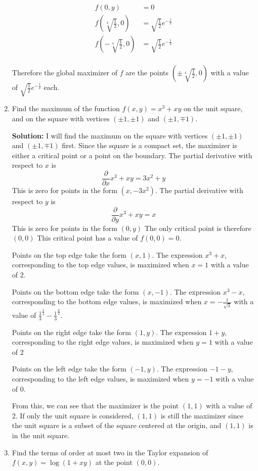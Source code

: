 \documentclass{report}
\newcommand{\solution}{\textbf{Solution: }}
\newcommand{\pdiv}[1]{\frac{\partial}{\partial #1}}
\begin{document}
\begin{enumerate}
	\begin{align*}
		f(0, y) &= 0 \\
		f(\sqrt[4]{\frac{1}{2}}, 0) &= \sqrt{\frac{1}{2}}e^{-\frac{1}{2}} \\
		f(-\sqrt[4]{\frac{1}{2}}, 0) &= \sqrt{\frac{1}{2}}e^{-\frac{1}{2}} \\
	\end{align*}

	Therefore the global maximizer of $f$ 
	are the points $(\pm \sqrt[4]{\frac{1}{2}}, 0)$
	with a value of $\sqrt{\frac{1}{2}}e^{-\frac{1}{2}}$ each.

	\medskip
	\item
	Find the maximum of the function $f(x,y) = x^3+xy$ on the unit square, 
	and on the square with vertices $(\pm 1, \pm 1)$ and $(\pm 1, \mp 1)$.

	\solution 
	I will find the maximum on the square with vertices 
	$(\pm 1, \pm 1)$ and $(\pm 1, \mp 1)$ first.
	Since the square is a compact set, 
	the maximizer is either a critical point or a point on the boundary.
	The partial derivative with respect to $x$ is 
	\[
		\pdiv{x} x^3 + xy = 3x^2 + y
	\]
	This is zero for points in the form $(x, -3x^2)$.
	The partial derivative with respect to $y$ is 
	\[
		\pdiv{y} x^3 + xy = x
	\]
	This is zero for points in the form $(0, y)$
	The only critical point is therefore $(0, 0)$
	This critical point has a value of $f(0, 0) = 0$.

	Points on the top edge take the form $(x, 1)$.
	The expression $x^3 + x$, corresponding to the top edge values,
	is maximized when $x=1$ with a value of 2.

	Points on the bottom edge take the form $(x, -1)$.
	The expression $x^3 - x$, corresponding to the bottom edge values,
	is maximized when $x= -\frac{1}{\sqrt{3}}$ 
	with a value of $\frac{1}{3}^\frac{1}{2} - \frac{1}{3}^\frac{3}{2}$.

	Points on the right edge take the form $(1, y)$.
	The expression $1 + y$, corresponding to the right edge values,
	is maximized when $y = 1$ with a value of 2 

	Points on the left edge take the form $(-1, y)$.
	The expression $-1-y$, corresponding to the left edge values,
	is maximized when $y=-1$ with a value of 0.

	From this, we can see that the maximizer is the point $(1, 1)$ 
	with a value of 2. 
	If only the unit square is considered, 
	$(1, 1)$ is still the maximizer since 
	the unit square is a subset of the square centered at the origin,
	and $(1, 1)$ is in the unit square.
	\medskip
	\item
	Find the terms of order at most two in the Taylor expansion of $f(x,y)=\log(1+xy)$ at the point
	$(0,0)$.
	

\end{enumerate}
\end{document}
